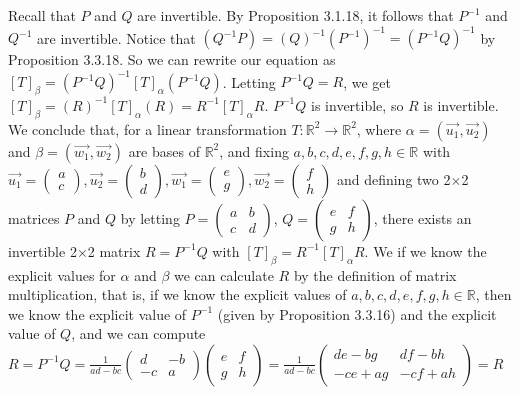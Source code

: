 \documentclass[12pt]{article}
\newenvironment{problem}[2][Problem]
{
	\begin{trivlist} 
		\item[\hskip \labelsep {\bfseries #1 #2:}]
	}
{
	\end{trivlist}
	}
\newenvironment{solution}[1][Solution]
{
	\begin{trivlist} 
		\item[\hskip \labelsep {\itshape #1:}]
	}
	{
	\end{trivlist}
}
\begin{document}
\begin{problem}{2}
\begin{solution}
Recall that $P$ and $Q$ are invertible. By Proposition 3.1.18, it follows that $P^{-1}$ and $Q^{-1}$ are invertible. Notice that $(Q^{-1} P) = (Q)^{-1} (P^{-1})^{-1} = (P^{-1} Q)^{-1}$ by Proposition 3.3.18. So we can rewrite our equation as $[T]_{\beta} =(P^{-1} Q)^{-1} [T]_{\alpha} (P^{-1} Q)$. Letting $P^{-1} Q =R$, we get $[T]_{\beta} =(R)^{-1} [T]_{\alpha} (R) =R^{-1} [T]_{\alpha} R$. $P^{-1} Q$ is invertible, so $R$ is invertible. We conclude that, for a linear transformation $T:\mathbb{R}^2 \to \mathbb{R}^2$, where $\alpha=(\vec{u_{1}},\vec{u_{2}})$ and  $\beta=(\vec{w_{1}},\vec{w_{2}})$ are bases of $\mathbb{R}^2$, and fixing $a,b,c,d, e,f,g,h \in \mathbb{R}$ with $\vec{u_{1}} = \begin{pmatrix} a\\c\end{pmatrix}, \vec{u_{2}} = \begin{pmatrix} b\\d\end{pmatrix}, \vec{w_{1}} = \begin{pmatrix} e\\g\end{pmatrix}, \vec{w_{2}} = \begin{pmatrix} f\\h\end{pmatrix}$ and defining two 2$\times$2 matrices $P$ and $Q$ by letting $P=\begin{pmatrix} a & b\\ c& d \end{pmatrix}$, $Q=\begin{pmatrix} e & f\\ g& h \end{pmatrix}$, there exists an invertible 2$\times$2 matrix $R=P^{-1} Q$ with $[T]_{\beta} = R^{-1} [T]_{\alpha} R$. We if we know the explicit values for $\alpha$ and $\beta$ we can calculate $R$ by the definition of matrix multiplication, that is, if we know the explicit values of $a,b,c,d, e,f,g,h \in \mathbb{R}$, then we know the explicit value of $P^{-1}$ (given by Proposition 3.3.16) and the explicit value of $Q$, and we can compute $R= P^{-1} Q = \frac{1}{ad-bc} \begin{pmatrix} d & -b \\-c & a\end{pmatrix} \begin{pmatrix} e & f\\ g & h \end{pmatrix} = \frac{1}{ad-bc} \begin{pmatrix} de -bg & df-bh \\ -ce + ag & -cf + ah \end{pmatrix} = R$
\end{solution}
\end{problem}
\end{document}
